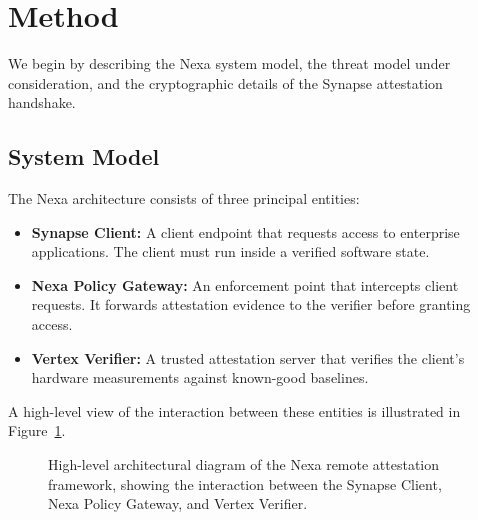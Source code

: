 \section{Method}
\label{sec:method}
We begin by describing the Nexa system model, the threat model under consideration, and the cryptographic details of the Synapse attestation handshake.

\subsection{System Model}
The Nexa architecture consists of three principal entities:
\begin{itemize}
    \item \textbf{Synapse Client:} A client endpoint that requests access to enterprise applications. The client must run inside a verified software state.
    \item \textbf{Nexa Policy Gateway:} An enforcement point that intercepts client requests. It forwards attestation evidence to the verifier before granting access.
    \item \textbf{Vertex Verifier:} A trusted attestation server that verifies the client's hardware measurements against known-good baselines.
\end{itemize}

A high-level view of the interaction between these entities is illustrated in Figure~\ref{fig:architecture}.

\begin{figure}[t]
  \centering
  \caption{High-level architectural diagram of the Nexa remote attestation framework, showing the interaction between the Synapse Client, Nexa Policy Gateway, and Vertex Verifier.}
  \label{fig:architecture}
\end{figure}

